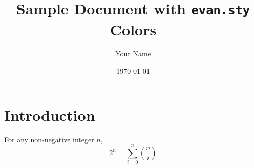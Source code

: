 \documentclass{scrartcl} %
\title{Sample Document with \texttt{evan.sty} Colors}
\author{Your Name}
\date{\today}
\begin{document}
\maketitle

\section{Introduction} %
\begin{theorem}
For any non-negative integer \( n \),
\[ 2^n = \sum_{i = 0}^{n} \binom{n}{i} \]
\end{theorem}
\end{document}
